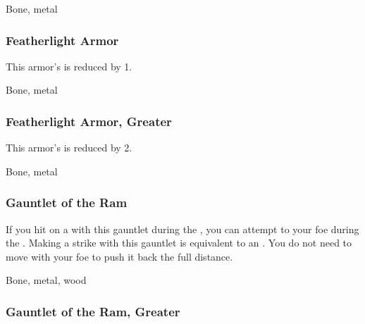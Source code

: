  


 Bone, metal


\lowercase{\hypertarget{item:Featherlight Armor}{}}\label{item:Featherlight Armor}
\hypertarget{item:Featherlight Armor}{\subsubsection{Featherlight Armor\hfill{}}}

This armor's  is reduced by 1.



 Bone, metal


\lowercase{\hypertarget{item:Featherlight Armor, Greater}{}}\label{item:Featherlight Armor, Greater}
\hypertarget{item:Featherlight Armor, Greater}{\subsubsection{Featherlight Armor, Greater\hfill{}}}

This armor's  is reduced by 2.



 Bone, metal


\lowercase{\hypertarget{item:Gauntlet of the Ram}{}}\label{item:Gauntlet of the Ram}
\hypertarget{item:Gauntlet of the Ram}{\subsubsection{Gauntlet of the Ram\hfill{}}}

If you hit on a  with this gauntlet during the , you can attempt to  your foe during the .
Making a strike with this gauntlet is equivalent to an .
You do not need to move with your foe to push it back the full distance.



 Bone, metal, wood


\lowercase{\hypertarget{item:Gauntlet of the Ram, Greater}{}}\label{item:Gauntlet of the Ram, Greater}
\hypertarget{item:Gauntlet of the Ram, Greater}{\subsubsection{Gauntlet of the Ram, Greater\hfill{}}}

